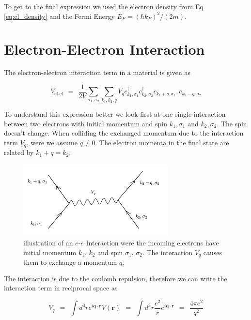 \documentclass[10pt]{report}
\numberwithin{equation}{chapter}
\newcommand{\refEq}[1]{
  Eq  \ref{#1}
}
\begin{document}
To get to the final expression we used the electron density from \refEq{eq:el_density} and the Fermi Energy $E_F = (\hbar k_F)^2/(2m)$. 



\section{Electron-Electron Interaction}

The electron-electron interaction term in a material is given as

\begin{equation}
  V_\text{el-el} ~~=~~ \frac{1}{2V} \sum_{\sigma_1, \sigma_2} \sum_{k_1, k_2, q} 
  V_q c^\dag_{k_1, \sigma_1} c^\dag_{k_2, \sigma_2} c_{k_1+q, \sigma_1}, c_{k_2-q, \sigma_2} 
\end{equation}


To understand this expression better we look first at one single interaction between two electrons with initial momentum and spin $k_1, \sigma_1$ and $k_2, \sigma_2$. The spin doesn't change. When colliding the exchanged momentum due to the interaction term $V_q$, were we assume $q \neq 0$. The electron momenta in the final state are related by $k_1 + q = k_2$.

\begin{figure}
  \centering
  \includegraphics[width=0.7\textwidth]{../img/sq_interaction.pdf}
  \caption{illustration of an $e$-$e$ Interaction were the incoming electrons have initial momentum $k_1$, $k_2$ and spin $\sigma_1$, $\sigma_2$. The interaction $V_q$ causes them to exchange a momentum $q$.}
\end{figure}


The interaction is due to the coulomb repulsion, therefore we can write the interaction term in reciprocal space as 

\begin{equation}
  V_q ~~=~~ \int d^3r e^{i\mathbf{q} \cdot \mathbf{r}} V(\mathbf{r}) 
  ~~=~~ \int d^3r \frac{e^2}{r} e^{i \mathbf{q} \cdot \mathbf{r}} 
  ~~=~~ \frac{4\pi e^2}{q^2}
\end{equation}
\end{document}
